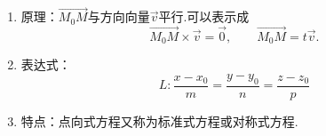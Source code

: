 \begin{enumerate}[\large1.]
\begin{enumerate}[]
		\item 原理：$\overrightarrow{M_0M}$与方向向量$\overrightarrow{v}$平行.可以表示成
		$$\overrightarrow{M_0M}\times\overrightarrow{v}=\overrightarrow{0},\qquad  \overrightarrow{M_0M}=t\overrightarrow{v}.$$
		\item 表达式：
		\begin{equation}
		L: \frac{x-x_0}{m}=\frac{y-y_0}{n}=\frac{z-z_0}{p}
		\end{equation}
		\item 特点：点向式方程又称为{\color{dy}标准式方程}或{\color{dy}对称式方程}.
	\end{enumerate}
	\begin{figure}[h]
\end{figure}
\end{enumerate}
